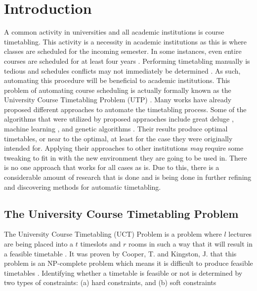 \chapter{Introduction} \label{sec:intro}

A common activity in universities and all academic institutions is course timetabling. This activity is a necessity in academic institutions as this is where classes are scheduled for the incoming semester. In some instances, even entire courses are scheduled for at least four years \cite{alves-novel-recursive}. Performing timetabling manually is tedious and schedules conflicts may not immediately be determined \cite{nlgdrl-obit}. As such, automating this procedure will be beneficial to academic institutions. This problem of automating course scheduling is actually formally known as the University Course Timetabling Problem (UTP) \cite{yousef-gpu-ga}\cite{socha-maxmin-ant-system}. Many works have already proposed different approaches to automate the timetabling process. Some of the algorithms that were utilized by proposed appraoches include great deluge \cite{gd-burked}\cite{nlgd-landa-silva}, machine learning \cite{nlgdrl-obit}, and genetic algorithms \cite{bedoya-non-standard-ga}\cite{raghavjee-ga-south-africa}\cite{yik-ga-timetabling}. Their results produce optimal timetables, or near to the optimal, at least for the case they were originally intended for. Applying their approaches to other institutions \textit{may} require some tweaking to fit in with the new environment they are going to be used in. There is no one approach that works for all cases as is. Due to this, there is a considerable amount of research that is done and is being done in further refining and discovering methods for automatic timetabling.

\section{The University Course Timetabling Problem}
The University Course Timetabling (UCT) Problem is a problem where $l$ lectures are being placed into a $t$ timeslots and $r$ rooms in such a way that it will result in a feasible timetable \cite{nlgd-landa-silva}. It was proven by Cooper, T. and Kingston, J. that this problem is an NP-complete problem which means it is difficult to produce feasible timetables \cite{cooper-timetable-problem-complexity}. Identifying whether a timetable is feasible or not is determined by two types of constraints: (a) hard constraints, and (b) soft constraints

